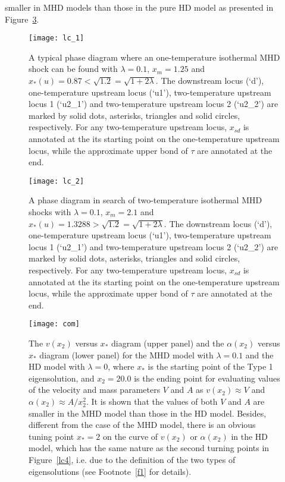 \documentclass[fleqn,usenatbib]{mnras}
\begin{document}
smaller in MHD models than those in the pure HD model as presented in Figure~\ref{com}.

\begin{figure}
\centering
\texttt{[image: lc\_1]}
\caption{A typical phase diagram where an one-temperature isothermal MHD shock can be found with $\lambda=0.1$, $x_{m}=1.25$ and $x_{*}(u)=0.87<\sqrt{1.2}=\sqrt{1+2\lambda}$. The downstream locus (`d'), one-temperature upstream locus (`u1'), two-temperature upstream locus 1 (`u2\_1') and two-temperature upstream locus 2 (`u2\_2') are marked by solid dots, asterisks, triangles and solid circles, respectively. For any two-temperature upstream locus, $x_{sd}$ is annotated at the its starting point on the one-temperature upstream locus, while the approximate upper bond of $\tau$ are annotated at the end.}
\label{lc1}
\end{figure}

\begin{figure}
\centering
\texttt{[image: lc\_2]}
\caption{A phase diagram in search of two-temperature isothermal MHD shocks with $\lambda=0.1$, $x_{m}=2.1$ and $x_{*}(u)=1.3288>\sqrt{1.2}=\sqrt{1+2\lambda}$. The downstream locus (`d'), one-temperature upstream locus (`u1'), two-temperature upstream locus 1 (`u2\_1') and two-temperature upstream locus 2 (`u2\_2') are marked by solid dots, asterisks, triangles and solid circles, respectively. For any two-temperature upstream locus, $x_{sd}$ is annotated at the its starting point on the one-temperature upstream locus, while the approximate upper bond of $\tau$ are annotated at the end.}
\label{lc2}
\end{figure}

\begin{figure}
\centering
\texttt{[image: com]}
\caption{The $v(x_{2})$ versus $x_{*}$ diagram (upper panel) and the $\alpha(x_{2})$ versus $x_{*}$ diagram (lower panel) for the MHD model with $\lambda=0.1$ and the HD model with $\lambda=0$, where $x_{*}$ is the starting point of the Type 1 eigensolution, and $x_{2}=20.0$ is the ending point for evaluating values of the velocity and mass parameters $V$ and $A$ as $v(x_{2})\approx V$ and $\alpha(x_{2})\approx A/x_{2}^{2}$. It is shown that the values of both $V$ and $A$ are smaller in the MHD model than those in the HD model. Besides, different from the case of the MHD model, there is an obvious tuning point $x_{*}=2$ on the curve of $v(x_{2})$ or $\alpha(x_{2})$ in the HD model, which has the same nature as the second turning points in Figure~\ref{lc4}, i.e. due to the definition of the two types of eigensolutions (see Footnote~\ref{f1} for details).}
\label{com}
\end{figure}
\end{document}
